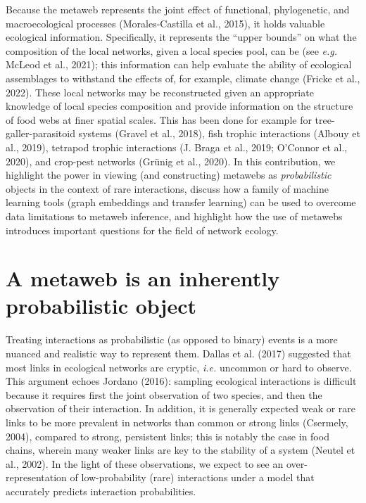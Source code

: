 \documentclass[11pt]{article}
\begin{document}
Because the metaweb represents the joint effect of functional,
phylogenetic, and macroecological processes (Morales-Castilla et al.,
2015), it holds valuable ecological information. Specifically, it
represents the ``upper bounds'' on what the composition of the local
networks, given a local species pool, can be (see \emph{e.g.} McLeod et
al., 2021); this information can help evaluate the ability of ecological
assemblages to withstand the effects of, for example, climate change
(Fricke et al., 2022). These local networks may be reconstructed given
an appropriate knowledge of local species composition and provide
information on the structure of food webs at finer spatial scales. This
has been done for example for tree-galler-parasitoid systems (Gravel et
al., 2018), fish trophic interactions (Albouy et al., 2019), tetrapod
trophic interactions (J. Braga et al., 2019; O'Connor et al., 2020), and
crop-pest networks (Grünig et al., 2020). In this contribution, we
highlight the power in viewing (and constructing) metawebs as
\emph{probabilistic} objects in the context of rare interactions,
discuss how a family of machine learning tools (graph embeddings and
transfer learning) can be used to overcome data limitations to metaweb
inference, and highlight how the use of metawebs introduces important
questions for the field of network ecology.

\hypertarget{a-metaweb-is-an-inherently-probabilistic-object}{%
\section{A metaweb is an inherently probabilistic
object}\label{a-metaweb-is-an-inherently-probabilistic-object}}

Treating interactions as probabilistic (as opposed to binary) events is
a more nuanced and realistic way to represent them. Dallas et al. (2017)
suggested that most links in ecological networks are cryptic,
\emph{i.e.} uncommon or hard to observe. This argument echoes Jordano
(2016): sampling ecological interactions is difficult because it
requires first the joint observation of two species, and then the
observation of their interaction. In addition, it is generally expected
weak or rare links to be more prevalent in networks than common or
strong links (Csermely, 2004), compared to strong, persistent links;
this is notably the case in food chains, wherein many weaker links are
key to the stability of a system (Neutel et al., 2002). In the light of
these observations, we expect to see an over-representation of
low-probability (rare) interactions under a model that accurately
predicts interaction probabilities.
\end{document}
